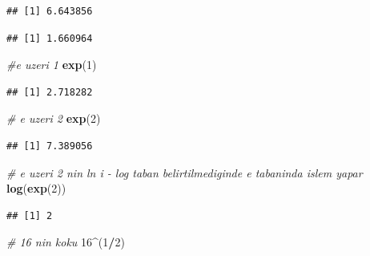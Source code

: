 \documentclass[]{book}
\newenvironment{Shaded}{\begin{snugshade}}{\end{snugshade}}
\newcommand{\CommentTok}[1]{\textcolor[rgb]{0.56,0.35,0.01}{\textit{#1}}}
\newcommand{\DecValTok}[1]{\textcolor[rgb]{0.00,0.00,0.81}{#1}}
\newcommand{\KeywordTok}[1]{\textcolor[rgb]{0.13,0.29,0.53}{\textbf{#1}}}
\newcommand{\NormalTok}[1]{#1}
\newcommand{\OperatorTok}[1]{\textcolor[rgb]{0.81,0.36,0.00}{\textbf{#1}}}
\begin{document}
\begin{verbatim}
## [1] 6.643856
\end{verbatim}

\begin{Shaded}
\end{Shaded}

\begin{verbatim}
## [1] 1.660964
\end{verbatim}

\begin{Shaded}
\begin{Highlighting}[]
\CommentTok{#e uzeri 1}
\KeywordTok{exp}\NormalTok{(}\DecValTok{1}\NormalTok{) }
\end{Highlighting}
\end{Shaded}

\begin{verbatim}
## [1] 2.718282
\end{verbatim}

\begin{Shaded}
\begin{Highlighting}[]
\CommentTok{# e uzeri 2}
\KeywordTok{exp}\NormalTok{(}\DecValTok{2}\NormalTok{) }
\end{Highlighting}
\end{Shaded}

\begin{verbatim}
## [1] 7.389056
\end{verbatim}

\begin{Shaded}
\begin{Highlighting}[]
 \CommentTok{# e uzeri 2 nin ln i - log taban belirtilmediginde e tabaninda islem yapar}
\KeywordTok{log}\NormalTok{(}\KeywordTok{exp}\NormalTok{(}\DecValTok{2}\NormalTok{))}
\end{Highlighting}
\end{Shaded}

\begin{verbatim}
## [1] 2
\end{verbatim}

\begin{Shaded}
\begin{Highlighting}[]
\CommentTok{# 16 nin koku}
\DecValTok{16}\OperatorTok{^}\NormalTok{(}\DecValTok{1}\OperatorTok{/}\DecValTok{2}\NormalTok{)}
\end{Highlighting}
\end{Shaded}
\end{document}
